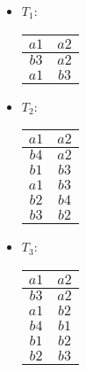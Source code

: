\begin{exercise}{5}
\begin{subexercise}
  \begin{itemize}
    \item $T_1$:
      \begin{tabular}{ c c }
        $a1$ & $a2$ \\ \hline
        $b3$ & $a2$ \\
        $a1$ & $b3$
      \end{tabular}
    \item $T_2$:
      \begin{tabular}{ c c }
        $a1$ & $a2$ \\ \hline
        $b4$ & $a2$ \\
        $b1$ & $b3$ \\
        $a1$ & $b3$ \\
        $b2$ & $b4$ \\
        $b3$ & $b2$
      \end{tabular}
    \item $T_3$:
      \begin{tabular}{ c c }
        $a1$ & $a2$ \\ \hline
        $b3$ & $a2$ \\
        $a1$ & $b2$ \\
        $b4$ & $b1$ \\
        $b1$ & $b2$ \\
        $b2$ & $b3$ \\
      \end{tabular}
  \end{itemize}
\end{subexercise}


\end{exercise}
